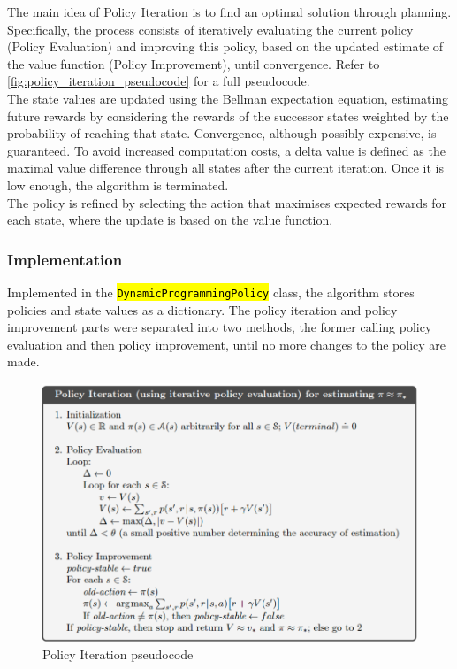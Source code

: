 \documentclass{class}
\def\code#1{\hl{\texttt{#1}}}
\begin{document}

The main idea of Policy Iteration is to find an optimal solution through planning. Specifically, the process consists of iteratively evaluating the current policy (Policy Evaluation) and improving this policy, based on the updated estimate of the value function (Policy Improvement), until convergence. Refer to \autoref{fig:policy_iteration_pseudocode} for a full pseudocode.
\\[0.3cm]
The state values are updated using the Bellman expectation equation, estimating future rewards by considering the rewards of the successor states weighted by the probability of reaching that state. Convergence, although possibly expensive, is guaranteed. To avoid increased computation costs, a delta value is defined as the maximal value difference through all states after the current iteration. Once it is low enough, the algorithm is terminated.
\\[0.3cm]
The policy is refined by selecting the action that maximises expected rewards for each state, where the update is based on the value function.

\subsubsection{Implementation}
Implemented in the \code{DynamicProgrammingPolicy} class, the algorithm stores policies and state values as a dictionary. The policy iteration and policy improvement parts were separated into two methods, the former calling policy evaluation and then policy improvement, until no more changes to the policy are made.

\begin{figure}[H]
    \centering
    \includegraphics[width=0.5\linewidth]{images/policy_iteration_pseudocode.png}
    \caption{Policy Iteration pseudocode \parencite[p. 80]{sutton-2018}}
    \label{fig:policy_iteration_pseudocode}
\end{figure}
\end{document}
